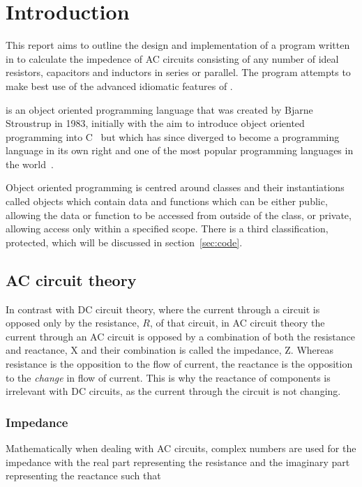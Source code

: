 \section{Introduction}
\label{sec:introduction}
This report aims to outline the design and implementation of a program written in \CC{} to calculate the impedence of AC circuits consisting of any number of ideal resistors, capacitors and inductors in series or parallel. The program attempts to make best use of the advanced idiomatic features of \CC.

\CC{} is an object oriented programming language that was created by Bjarne Stroustrup in 1983, initially with the aim to introduce object oriented programming into C~\cite{ref:} but which has since diverged to become a programming language in its own right and one of the most popular programming languages in the world~\cite{ref:}.

Object oriented programming is centred around classes and their instantiations called objects which contain data and functions which can be either public, allowing the data or function to be accessed from outside of the class, or private, allowing access only within a specified scope. There is a third classification, protected, which will be discussed in section~\ref{sec:code}.

\subsection{AC circuit theory}
In contrast with DC circuit theory, where the current through a circuit is opposed only by the resistance, $R$, of that circuit, in AC circuit theory the current through an AC circuit is opposed by a combination of both the resistance and reactance, X and their combination is called the impedance, Z. Whereas resistance is the opposition to the flow of current, the reactance is the opposition to the \textit{change} in flow of current. This is why the reactance of components is irrelevant with DC circuits, as the current through the circuit is not changing.

\subsubsection*{Impedance}

Mathematically when dealing with AC circuits, complex numbers are used for the impedance with the real part representing the resistance and the imaginary part representing the reactance such that

